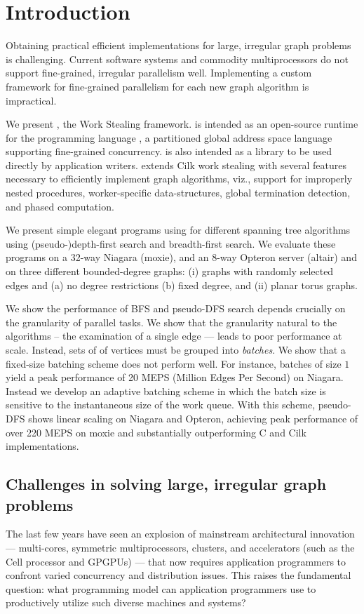 \section{Introduction}
\label{s:intr}\label{sec:intro}

Obtaining practical efficient implementations for large, irregular
graph problems is challenging. Current software systems and commodity
multiprocessors do not support fine-grained, irregular parallelism
well. Implementing a custom framework for fine-grained parallelism for
each new graph algorithm is impractical.

We present \XWS{}, the \Xten{} Work Stealing framework.  \XWS{} is
intended as an open-source runtime for the programming language
\Xten{} \cite{x10}, a partitioned global address space language supporting
fine-grained concurrency.  \XWS{} is also intended as a library to be
used directly by application writers. \XWS{} extends Cilk
work stealing \cite{BJKLRZ95,frigo98implementation} with several
features necessary to efficiently implement graph algorithms, viz.,
support for improperly nested procedures, worker-specific
data-structures, global termination detection, and phased computation.

We present simple elegant programs using \XWS{} for different spanning
tree algorithms using (pseudo-)depth-first search and breadth-first
search.  We evaluate these programs on a 32-way Niagara (moxie), and
an 8-way Opteron server (altair) and on three different bounded-degree
graphs: (i) graphs with randomly selected edges and (a) no degree
restrictions (b) fixed degree, and (ii) planar torus graphs.

We show the performance of BFS and pseudo-DFS search depends crucially
on the granularity of parallel tasks. We show that the granularity
natural to the algorithms -- the examination of a single edge ---
leads to poor performance at scale. Instead, sets of of vertices must
be grouped into {\em batches}. We show that a fixed-size batching
scheme does not perform well. For instance, batches of size $1$ yield
a peak performance of 20 MEPS (Million Edges Per Second) on Niagara.
Instead we develop an adaptive batching scheme in which the batch
size is sensitive to the instantaneous size of the work queue.  With
this scheme, pseudo-DFS shows linear scaling on Niagara and Opteron,
achieving peak performance of over 220 MEPS on moxie and substantially
outperforming C and Cilk implementations.

\subsection{Challenges in solving large, irregular graph problems}
The last few years have seen an explosion of mainstream
architectural innovation --- multi-cores, symmetric multiprocessors,
clusters, and accelerators (such as the Cell processor and GPGPUs) ---
that now requires application programmers to confront varied
concurrency and distribution issues. This raises the fundamental
question: what programming model can application programmers use to
productively utilize such diverse machines and systems?

